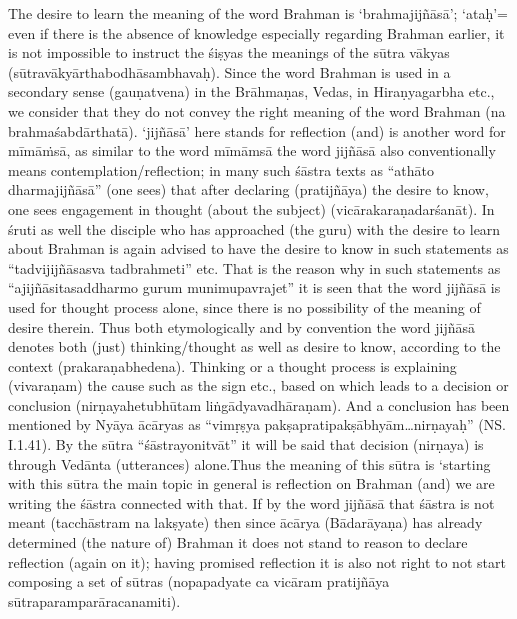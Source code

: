 
The desire to learn the meaning of the word Brahman is ‘brahmajijñāsā’; ‘ataḥ’= even if there is the absence of knowledge especially regarding Brahman earlier, it is not impossible to instruct the śiṣyas the meanings of the sūtra vākyas (sūtravākyārthabodhāsambhavaḥ). Since the word Brahman is used in a secondary sense (gauṇatvena) in the Brāhmaṇas, Vedas, in Hiraṇyagarbha etc., we consider that they do not convey the right meaning of the word Brahman (na brahmaśabdārthatā). ‘jijñāsā’ here stands for reflection (and) is another word for mīmāṁsā, as similar to the word mīmāmsā the word jijñāsā also conventionally means contemplation/reflection; in many such śāstra texts as “athāto dharmajijñāsā” (one sees) that after declaring (pratijñāya) the desire to know, one sees engagement in thought (about the subject) (vicārakaraṇadarśanāt). In śruti as well the disciple who has approached (the guru) with the desire to learn about Brahman is again advised to have the desire to know in such statements as “tadvijijñā\-sasva tadbrahmeti” etc. That is the reason why in such statements as “ajijñāsitasaddharmo gurum munimupavrajet” it is seen that the word jijñāsā is used for thought process alone, since there is no possibility of the meaning of desire therein. Thus both etymologically and by convention the word jijñāsā denotes both (just) thinking/thought as well as desire to know, according to the context (prakaraṇabhedena). Thinking or a thought process is explaining (vivaraṇam) the cause such as the sign etc., based on which leads to a decision or conclusion (nirṇayahetubhūtam liṅ\-gādyavadhāraṇam). And a conclusion has been mentioned by Nyāya ācāryas as “vimṛṣya pakṣapratipakṣābhyām…nirṇayaḥ” (NS. I.1.41). By the sūtra “śāstrayonitvāt” it will be said that decision (nirṇaya) is through Vedānta (utterances) alone.\break Thus the meaning of this sūtra is ‘starting with this sūtra the main topic in general is reflection on Brahman (and) we are writing  the śāstra connected with that. If by the word jijñāsā that śāstra is not meant (tacchāstram na lakṣyate) then since ācārya (Bādarāyaṇa) has already determined (the nature of) Brahman it does not stand to reason to declare reflection (again on it); having promised reflection it is also not right to not start composing a set of sūtras (nopapadyate ca vicāram pratijñāya sūtraparamparāracanamiti).

